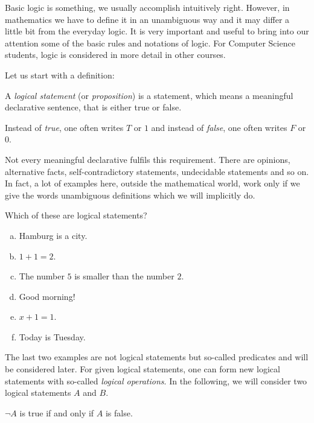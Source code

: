 

Basic logic is something, we usually accomplish intuitively right. However, in mathematics we have to define it in an unambiguous way
and it may differ a little bit from the everyday logic.
It is very important and useful to bring into our attention some of the basic rules and notations of logic. 
For Computer Science students, logic is considered in more detail in other courses. 

Let us start with a definition:
\begin{definition}
A \emph{logical statement} (or \emph{proposition})
is a statement, which means a meaningful declarative sentence,
that is either true or false.
\end{definition}

Instead of \emph{true}, one often writes $T$ or $1$
and instead of \emph{false}, one often writes $F$ or $0$.

Not every meaningful declarative fulfils this requirement. 
There are opinions, alternative facts, self-contradictory statements, undecidable statements and so on. In fact, a lot of examples here, outside the mathematical world, work only if we give the words unambiguous definitions
which we will implicitly do.

\begin{example}
Which of these are logical statements?
 	\begin{enumerate}[(a)]
 		\item Hamburg is a city.
 		\item $1 + 1 = 2$.
 		\item The number $5$ is smaller than the number $2$.
 		\item Good morning!
 		\item $x + 1 = 1$.
 		\item Today is Tuesday.
 	\end{enumerate}
\end{example}
%
The last two examples are not logical statements but so-called predicates and will be considered later.
%
For given logical statements, one can form new logical statements with so-called \emph{logical operations}.
In the following, we will consider two logical statements $A$ and $B$.

\begin{definition}
 $\neg A$ is true if and only if $A$ is false.
\end{definition}

